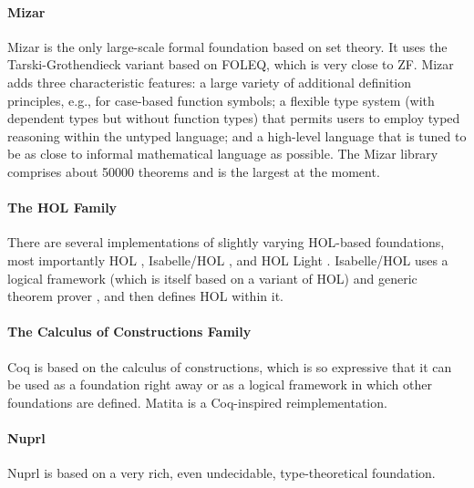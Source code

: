\paragraph{Mizar}
Mizar is the only large-scale formal foundation based on set theory. It uses the Tarski-Grothendieck variant based on FOLEQ, which is very close to ZF. Mizar adds three characteristic features: a large variety of additional definition principles, e.g., for case-based function symbols; a flexible type system (with dependent types but without function types) that permits users to employ typed reasoning within the untyped language; and a high-level language that is tuned to be as close to informal mathematical language as possible. The Mizar library comprises about 50000 theorems and is the largest at the moment.

\paragraph{The HOL Family}
There are several implementations of slightly varying HOL-based foundations, most importantly HOL \cite{hol}, Isabelle/HOL \cite{isabellehol}, and HOL Light \cite{hollight}. Isabelle/HOL uses a logical framework (which is itself based on a variant of HOL) and generic theorem prover \cite{isabelle}, and then defines HOL within it.

\paragraph{The Calculus of Constructions Family}
Coq \cite{coq} is based on the calculus of constructions, which is so expressive that it can be used as a foundation right away or as a logical framework in which other foundations are defined. Matita \cite{matita} is a Coq-inspired reimplementation.

\paragraph{Nuprl}
Nuprl \cite{nuprl} is based on a very rich, even undecidable, type-theoretical foundation.
